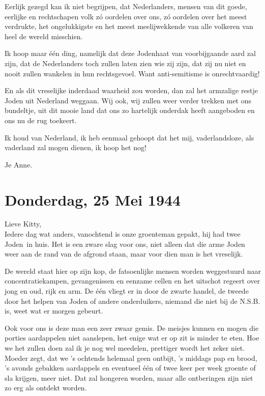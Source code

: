\documentclass{book}
\begin{document}
Eerlijk gezegd kan ik niet begrijpen, dat Nederlanders, mensen van dit
goede, eerlijke en rechtschapen volk zó oordelen over ons, zó oordelen
over het meest verdrukte, het ongelukkigste en het meest meelijwekkende
van alle volkeren van heel de wereld misschien.

Ik hoop maar één ding, namelijk dat deze Jodenhaat van voorbijgaande
aard zal zijn, dat de Nederlanders toch zullen laten zien wie zij zijn,
dat zij nu niet en nooit zullen wankelen in hun rechtsgevoel. Want
anti-semitisme is onrechtvaardig!

En als dit vreselijke inderdaad waarheid zou worden, dan zal het
armzalige restje Joden uit Nederland weggaan. Wij ook, wij zullen weer
verder trekken met ons bundeltje, uit dit mooie land dat ons zo
hartelijk onderdak heeft aangeboden en ons nu de rug toekeert.

Ik houd van Nederland, ik heb eenmaal gehoopt dat het mij,
vaderlandsloze, als vaderland zal mogen dienen, ik hoop het nog!

Je Anne.

\chapter{Donderdag, 25 Mei 1944}

Lieve Kitty,\\Iedere dag wat anders, vanochtend is onze groenteman
gepakt, hij had twee Joden~in huis. Het is een zware slag voor ons, niet
alleen dat die arme Joden weer aan de rand van de afgrond staan, maar
voor dien man is het vreselijk.

De wereld staat hier op zijn kop, de fatsoenlijke mensen worden
weggestuurd naar concentratiekampen, gevangenissen en eenzame cellen en
het uitschot regeert over jong en oud, rijk en arm. De één vliegt er in
door de zwarte handel, de tweede door het helpen van Joden of andere
onderduikers, niemand die niet bij de N.S.B. is, weet wat er morgen
gebeurt.

Ook voor ons is deze man een zeer zwaar gemis. De meisjes kunnen en
mogen die porties aardappelen niet aanslepen, het enige wat er op zit is
minder te eten. Hoe we het zullen doen zal ik je nog wel meedelen,
prettiger wordt het zeker niet. Moeder zegt, dat we 's ochtends helemaal
geen ontbijt, 's middags pap en brood, 's avonds gebakken aardappels en
eventueel één of twee keer per week groente of sla krijgen, meer niet.
Dat zal hongeren worden, maar alle ontberingen zijn niet zo erg als
ontdekt worden.
\end{document}
